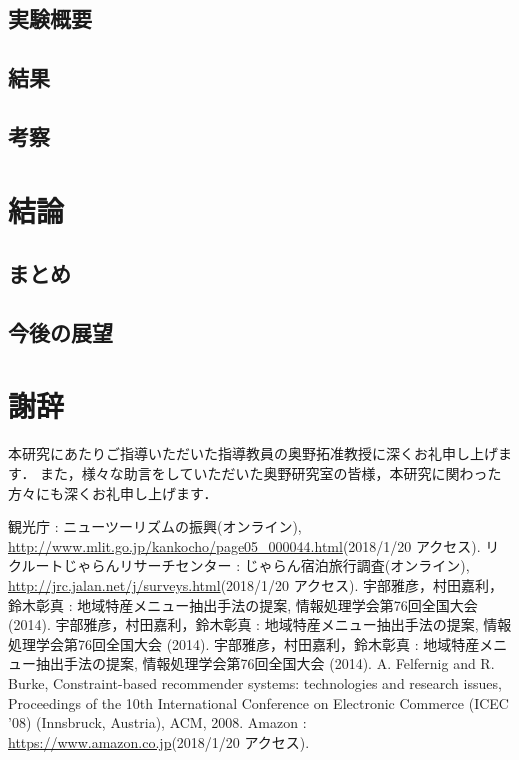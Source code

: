 \documentclass{funthesis}
\begin{document}
\section{実験概要}

\section{結果}

\section{考察}

\chapter{結論}

\section{まとめ}

\section{今後の展望}

\chapter *{謝辞}
本研究にあたりご指導いただいた指導教員の奥野拓准教授に深くお礼申し上げます．
また，様々な助言をしていただいた奥野研究室の皆様，本研究に関わった方々にも深くお礼申し上げます．



\begin{thebibliography}{99}
 観光庁 : ニューツーリズムの振興(オンライン), \url{http://www.mlit.go.jp/kankocho/page05_000044.html}(2018/1/20 アクセス).
 リクルートじゃらんリサーチセンター : じゃらん宿泊旅行調査(オンライン), \url{http://jrc.jalan.net/j/surveys.html}(2018/1/20 アクセス).
 宇部雅彦，村田嘉利，鈴木彰真 : 地域特産メニュー抽出手法の提案, 情報処理学会第76回全国大会 (2014).
 宇部雅彦，村田嘉利，鈴木彰真 : 地域特産メニュー抽出手法の提案, 情報処理学会第76回全国大会 (2014).
 宇部雅彦，村田嘉利，鈴木彰真 : 地域特産メニュー抽出手法の提案, 情報処理学会第76回全国大会 (2014).
 A. Felfernig and R. Burke, Constraint-based recommender systems: technologies and research issues, Proceedings of the 10th International Conference on Electronic Commerce (ICEC '08) (Innsbruck, Austria), ACM, 2008.
 Amazon : \url{https://www.amazon.co.jp}(2018/1/20 アクセス).
\end{thebibliography}

\listoftables

\listoffigures
\end{document}
